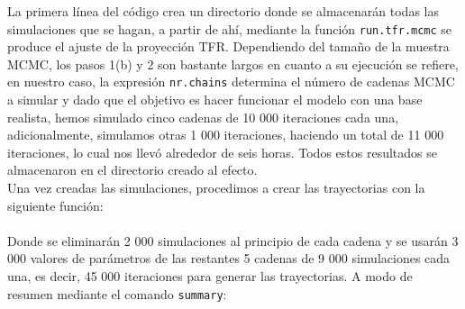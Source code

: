 La primera línea del código crea un directorio donde se almacenarán todas las simulaciones que se hagan, a partir de ahí, mediante la función \texttt{run.tfr.mcmc} se produce el ajuste de la proyección TFR. Dependiendo del tamaño de la muestra MCMC, los pasos 1(b) y 2 son bastante largos en cuanto a su ejecución se refiere, en nuestro caso, la expresión \texttt{nr.chains} determina el número de cadenas MCMC a simular y dado que el objetivo es hacer funcionar el modelo con una base realista, hemos simulado cinco cadenas de 10 000 iteraciones cada una, adicionalmente, simulamos otras 1 000 iteraciones, haciendo un total de 11 000 iteraciones, lo cual nos llevó alrededor de seis horas. Todos estos resultados se almacenaron en el directorio creado al efecto.\\

Una vez creadas las simulaciones, procedimos a crear las trayectorias con la siguiente función:\\

{
\setlength{\fboxsep}{0.75pt}%
\noindent\setlength{\fboxrule}{0pt}%
}\\

Donde se eliminarán 2 000 simulaciones al principio de cada cadena y se usarán 3 000 valores de parámetros de las restantes 5 cadenas de 9 000 simulaciones cada una, es decir, 45 000 iteraciones para generar las trayectorias. A modo de resumen mediante el comando \texttt{summary}:\\

{
\setlength{\fboxsep}{0.75pt}%
\noindent\setlength{\fboxrule}{0pt}%
}\\

